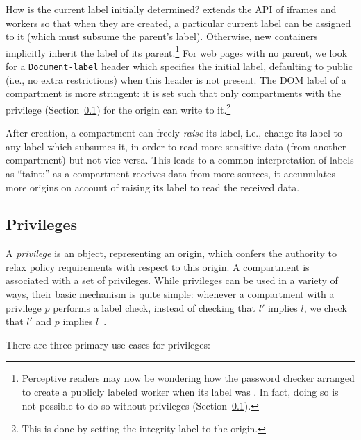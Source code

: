 How is the current label initially determined?
%
\sys{} extends the API of iframes and workers so that when they are
created, a particular current label can be assigned to it (which
must subsume the parent's label).  Otherwise, new containers implicitly
inherit the label of its parent.\footnote{Perceptive readers may now be wondering how
the password checker arranged to create a publicly labeled worker
when its label was .  In fact, doing so is not possible
to do so without privileges (Section~\ref{sec:privileges}).}
%
For web pages with no parent, we look for a {\tt Document-label} header which
specifies the initial label, defaulting to public (i.e., no extra
restrictions) when this header is not present.
%
The DOM label of a compartment is more stringent: it is set such that
only compartments with the privilege (Section~\ref{sec:privileges}) for the origin can write to
it.\footnote{This is done by setting the integrity label to the origin.}

After creation, a compartment can freely \emph{raise} its label, i.e.,
change its label to any label which subsumes it, in order to read more
sensitive data (from another compartment) but not vice versa.
%
This leads to a common interpretation of labels as ``taint;'' as
a compartment receives data from more sources, it accumulates more
origins on account of raising its label to read the received data.

\subsection{Privileges}
\label{sec:privileges}

A \emph{privilege} is an object, representing an origin, which confers
the authority to relax policy requirements with respect to this origin.
%
A compartment is associated with a set of privileges.
%
While privileges can be used in a variety of ways, their basic mechanism
is quite simple:  whenever a compartment with a privilege $p$ performs a
label check, instead of checking that $l'$ implies $l$, we check that
$l'$ and $p$ implies $l$~\cite{stefan:2011:dclabels}.

There are three primary use-cases for privileges:

